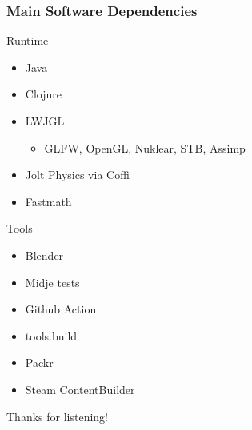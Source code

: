 \documentclass[aspectratio=169,11pt,xcolor=dvipsnames]{beamer}
\begin{document}
\begin{frame}
  \frametitle{Main Software Dependencies}
  \begin{minipage}[t]{0.49\textwidth}
    Runtime
    \begin{itemize}
      \item Java
      \item Clojure
      \item LWJGL
        \begin{itemize}
          \item GLFW, OpenGL, Nuklear, STB, Assimp
        \end{itemize}
      \item Jolt Physics via Coffi
      \item Fastmath
    \end{itemize}
  \end{minipage}
  \begin{minipage}[t]{0.49\textwidth}
    Tools
    \begin{itemize}
      \item Blender
      \item Midje tests
      \item Github Action
      \item tools.build
      \item Packr
      \item Steam ContentBuilder
    \end{itemize}
  \end{minipage}
\end{frame}

\begin{frame}
  \begin{center}
    \begin{huge}
      Thanks for listening!
    \end{huge}
  \end{center}
\end{frame}
\end{document}
